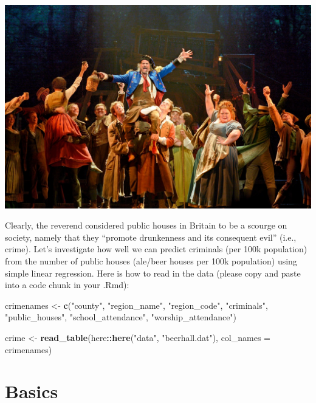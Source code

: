 \documentclass[]{article}
\newenvironment{Shaded}{\begin{snugshade}}{\end{snugshade}}
\newcommand{\DataTypeTok}[1]{\textcolor[rgb]{0.13,0.29,0.53}{#1}}
\newcommand{\KeywordTok}[1]{\textcolor[rgb]{0.13,0.29,0.53}{\textbf{#1}}}
\newcommand{\NormalTok}[1]{#1}
\newcommand{\OperatorTok}[1]{\textcolor[rgb]{0.81,0.36,0.00}{\textbf{#1}}}
\newcommand{\StringTok}[1]{\textcolor[rgb]{0.31,0.60,0.02}{#1}}
\begin{document}
\includegraphics{../images/03.LesMiserables.US.MasteroftheHouse.jpg}

Clearly, the reverend considered public houses in Britain to be a
scourge on society, namely that they ``promote drunkenness and its
consequent evil'' (i.e., crime). Let's investigate how well we can
predict criminals (per 100k population) from the number of public houses
(ale/beer houses per 100k population) using simple linear regression.
Here is how to read in the data (please copy and paste into a code chunk
in your .Rmd):

\begin{Shaded}
\begin{Highlighting}[]
\NormalTok{crimenames <-}\StringTok{ }\KeywordTok{c}\NormalTok{(}\StringTok{"county"}\NormalTok{, }\StringTok{"region_name"}\NormalTok{, }\StringTok{"region_code"}\NormalTok{,}
               \StringTok{"criminals"}\NormalTok{, }\StringTok{"public_houses"}\NormalTok{, }\StringTok{"school_attendance"}\NormalTok{,}
               \StringTok{"worship_attendance"}\NormalTok{)}

\NormalTok{crime <-}\StringTok{ }\KeywordTok{read_table}\NormalTok{(here}\OperatorTok{::}\KeywordTok{here}\NormalTok{(}\StringTok{"data"}\NormalTok{, }\StringTok{"beerhall.dat"}\NormalTok{),}
                    \DataTypeTok{col_names =}\NormalTok{ crimenames)}
\end{Highlighting}
\end{Shaded}

\hypertarget{basics}{%
\section{Basics}\label{basics}}
\end{document}
